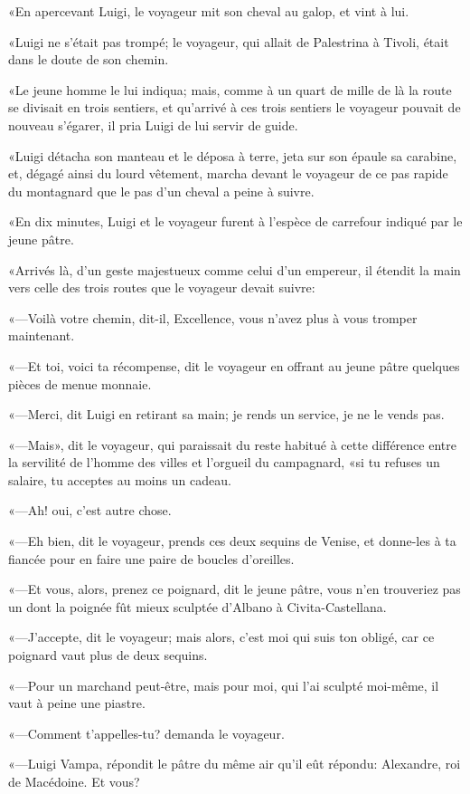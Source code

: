«En apercevant Luigi, le voyageur mit son cheval au galop, et vint à lui. 

«Luigi ne s'était pas trompé; le voyageur, qui allait de Palestrina à Tivoli, était dans le doute de son chemin. 

«Le jeune homme le lui indiqua; mais, comme à un quart de mille de là la route se divisait en trois sentiers, et qu'arrivé à ces trois sentiers le voyageur pouvait de nouveau s'égarer, il pria Luigi de lui servir de guide. 

«Luigi détacha son manteau et le déposa à terre, jeta sur son épaule sa carabine, et, dégagé ainsi du lourd vêtement, marcha devant le voyageur de ce pas rapide du montagnard que le pas d'un cheval a peine à suivre. 

«En dix minutes, Luigi et le voyageur furent à l'espèce de carrefour indiqué par le jeune pâtre. 

«Arrivés là, d'un geste majestueux comme celui d'un empereur, il étendit la main vers celle des trois routes que le voyageur devait suivre: 

«—Voilà votre chemin, dit-il, Excellence, vous n'avez plus à vous tromper maintenant. 

«—Et toi, voici ta récompense, dit le voyageur en offrant au jeune pâtre quelques pièces de menue monnaie. 

«—Merci, dit Luigi en retirant sa main; je rends un service, je ne le vends pas. 

«—Mais», dit le voyageur, qui paraissait du reste habitué à cette différence entre la servilité de l'homme des villes et l'orgueil du campagnard, «si tu refuses un salaire, tu acceptes au moins un cadeau. 

«—Ah! oui, c'est autre chose. 

«—Eh bien, dit le voyageur, prends ces deux sequins de Venise, et donne-les à ta fiancée pour en faire une paire de boucles d'oreilles. 

«—Et vous, alors, prenez ce poignard, dit le jeune pâtre, vous n'en trouveriez pas un dont la poignée fût mieux sculptée d'Albano à Civita-Castellana.  

«—J'accepte, dit le voyageur; mais alors, c'est moi qui suis ton obligé, car ce poignard vaut plus de deux sequins. 

«—Pour un marchand peut-être, mais pour moi, qui l'ai sculpté moi-même, il vaut à peine une piastre. 

«—Comment t'appelles-tu? demanda le voyageur. 

«—Luigi Vampa, répondit le pâtre du même air qu'il eût répondu: Alexandre, roi de Macédoine. Et vous? 

